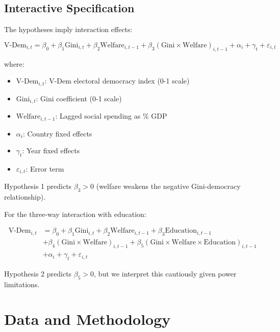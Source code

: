 \documentclass[11pt,letterpaper]{article}
\begin{document}
\subsection{Interactive Specification}

The hypotheses imply interaction effects:

\begin{equation}
\text{V-Dem}_{i,t} = \beta_0 + \beta_1 \text{Gini}_{i,t} + \beta_2 \text{Welfare}_{i,t-1} + \beta_3 (\text{Gini} \times \text{Welfare})_{i,t-1} + \alpha_i + \gamma_t + \varepsilon_{i,t}
\end{equation}

where:
\begin{itemize}
  \item $\text{V-Dem}_{i,t}$: V-Dem electoral democracy index (0-1 scale)
  \item $\text{Gini}_{i,t}$: Gini coefficient (0-1 scale)
  \item $\text{Welfare}_{i,t-1}$: Lagged social spending as \% GDP
  \item $\alpha_i$: Country fixed effects
  \item $\gamma_t$: Year fixed effects
  \item $\varepsilon_{i,t}$: Error term
\end{itemize}

Hypothesis 1 predicts $\beta_3 > 0$ (welfare weakens the negative Gini-democracy relationship).

For the three-way interaction with education:

\begin{equation}
\begin{split}
\text{V-Dem}_{i,t} &= \beta_0 + \beta_1 \text{Gini}_{i,t} + \beta_2 \text{Welfare}_{i,t-1} + \beta_3 \text{Education}_{i,t-1} \\
&+ \beta_4 (\text{Gini} \times \text{Welfare})_{i,t-1} + \beta_5 (\text{Gini} \times \text{Welfare} \times \text{Education})_{i,t-1} \\
&+ \alpha_i + \gamma_t + \varepsilon_{i,t}
\end{split}
\end{equation}

Hypothesis 2 predicts $\beta_5 > 0$, but we interpret this cautiously given power limitations.

\section{Data and Methodology}
\end{document}
